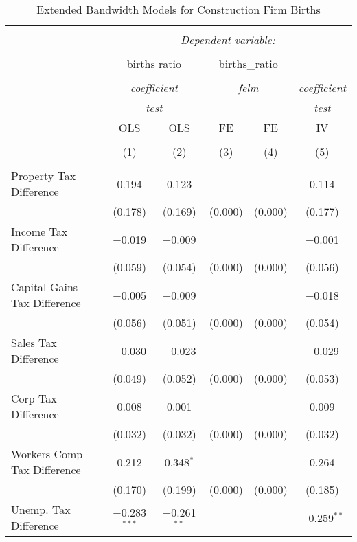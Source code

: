 
\begin{table}[!htbp] \centering 
  \caption{Extended Bandwidth Models for  Construction Firm Births} 
  \label{} 
\begin{tabular}{@{\extracolsep{5pt}}lccccc} 
\\[-1.8ex]\hline 
\hline \\[-1.8ex] 
 & \multicolumn{5}{c}{\textit{Dependent variable:}} \\ 
\cline{2-6} 
\\[-1.8ex] & \multicolumn{2}{c}{births ratio} & \multicolumn{2}{c}{births\_ratio} &   \\ 
\\[-1.8ex] & \multicolumn{2}{c}{\textit{coefficient}} & \multicolumn{2}{c}{\textit{felm}} & \textit{coefficient} \\ 
 & \multicolumn{2}{c}{\textit{test}} & \multicolumn{2}{c}{\textit{}} & \textit{test} \\ 
 & OLS & OLS & FE & FE & IV \\ 
\\[-1.8ex] & (1) & (2) & (3) & (4) & (5)\\ 
\hline \\[-1.8ex] 
 Property Tax Difference & 0.194 & 0.123 &  &  & 0.114 \\ 
  & (0.178) & (0.169) & (0.000) & (0.000) & (0.177) \\ 
  Income Tax Difference & $-$0.019 & $-$0.009 &  &  & $-$0.001 \\ 
  & (0.059) & (0.054) & (0.000) & (0.000) & (0.056) \\ 
  Capital Gains Tax Difference & $-$0.005 & $-$0.009 &  &  & $-$0.018 \\ 
  & (0.056) & (0.051) & (0.000) & (0.000) & (0.054) \\ 
  Sales Tax Difference & $-$0.030 & $-$0.023 &  &  & $-$0.029 \\ 
  & (0.049) & (0.052) & (0.000) & (0.000) & (0.053) \\ 
  Corp Tax Difference & 0.008 & 0.001 &  &  & 0.009 \\ 
  & (0.032) & (0.032) & (0.000) & (0.000) & (0.032) \\ 
  Workers Comp Tax Difference & 0.212 & 0.348$^{*}$ &  &  & 0.264 \\ 
  & (0.170) & (0.199) & (0.000) & (0.000) & (0.185) \\ 
  Unemp. Tax Difference & $-$0.283$^{***}$ & $-$0.261$^{**}$ &  &  & $-$0.259$^{**}$ \\ 

\end{tabular}
\end{table}
